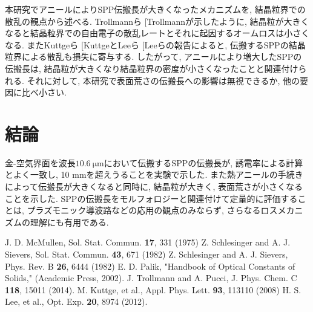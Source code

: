 \documentclass[a4,10truept]{jsarticle}
\makeatletter
\DeclareRobustCommand\cite{\unskip
\@ifnextchar[{\@tempswatrue\@citex}{\@tempswafalse\@citex[]}}
\makeatother
\begin{document}
本研究でアニールによりSPP伝搬長が大きくなったメカニズムを, 結晶粒界での散乱の観点から述べる. Trollmannら\cite{Trollmann}が示したように, 結晶粒が大きくなると結晶粒界での自由電子の散乱レートとそれに起因するオームロスは小さくなる. またKuttgeら\cite{Kuttge}とLeeら\cite{Lee}らの報告によると, 伝搬するSPPの結晶粒界による散乱も損失に寄与する. したがって, アニールにより増大したSPPの伝搬長は, 結晶粒が大きくなり結晶粒界の密度が小さくなったことと関連付けられる. それに対して, 本研究で表面荒さの伝搬長への影響は無視できるか, 他の要因に比べ小さい. 

\vspace{-0.2em}
\section{結論}
\vspace{-0.5em}
金-空気界面を波長$10.6\:\mathrm{\mu m}$において伝搬するSPPの伝搬長が, 誘電率による計算とよく一致し, 10 mmを超えうることを実験で示した. また熱アニールの手続きによって伝搬長が大きくなると同時に, 結晶粒が大きく, 表面荒さが小さくなることを示した. SPPの伝搬長をモルフォロジーと関連付けて定量的に評価することは, プラズモニック導波路などの応用の観点のみならず, さらなるロスメカニズムの理解にも有用である. 

%
%
\vspace{-0.2em}
\begin{thebibliography}{9}
\vspace{-0.5em}
 J. D. McMullen, Sol. Stat. Commun. {\bf 17}, 331 (1975)
 Z. Schlesinger and A. J. Sievers, Sol. Stat. Commun. {\bf 43}, 671 (1982)
 Z. Schlesinger and A. J. Sievers, Phys. Rev. B {\bf 26}, 6444 (1982)
 E. D. Palik, "Handbook of Optical Constants of Solids," (Academic Press, 2002).
 J. Trollmann and A. Pucci, J. Phys. Chem. C {\bf 118}, 15011 (2014).
 M. Kuttge, et al., Appl. Phys. Lett. {\bf 93}, 113110 (2008)
 H. S. Lee, et al., Opt. Exp. {\bf 20}, 8974 (2012).
\end{thebibliography}
\end{document}
